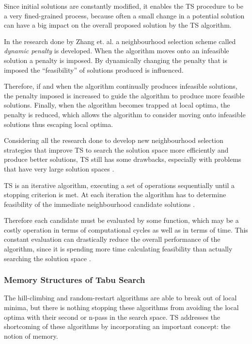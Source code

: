 Since initial solutions are constantly modified, it enables the \gls{TS} procedure to be a very fined-grained process, because often a small change in a potential solution can have a big impact on the overall proposed solution by the \gls{TS} algorithm.

In the research done by Zhang et. al.\cite{TSHazardous} a neighbourhood selection scheme called \emph{dynamic penalty} is developed. When the algorithm moves onto an infeasible solution a penalty is imposed. By dynamically changing the penalty that is imposed the ``feasibility'' of solutions produced is influenced. 

Therefore, if and when the algorithm continually produces infeasible solutions, the penalty imposed is increased to guide the algorithm to produce more feasible solutions. Finally, when the algorithm becomes trapped at local optima, the penalty is reduced, which allows the algorithm to consider moving onto infeasible solutions thus escaping local optima.

Considering all the research done to develop new neighbourhood selection strategies that improve \gls{TS} to search the solution space more efficiently and produce better solutions, \gls{TS} still has some drawbacks, especially with problems that have very large solution spaces \cite{EvoParallelTabu}.

TS is an iterative algorithm, executing a set of operations sequentially until a stopping criterion is met\cite{EvoParallelTabu,TabuVechicleRoutingWithTimeWindows}. At each iteration the algorithm has to determine feasibility of the immediate neighbourhood candidate solutions \cite{EvoParallelTabu,TabuVechicleRoutingWithTimeWindows}. 

Therefore each candidate must be evaluated by some function, which may be a costly operation in terms of computational cycles as well as in terms of time\cite{EvoParallelTabu,TabuVechicleRoutingWithTimeWindows}. This constant evaluation can drastically reduce the overall performance of the algorithm, since it is spending more time calculating feasibility than actually searching the solution space \cite{EvoParallelTabu,TabuVechicleRoutingWithTimeWindows}. 

\subsubsection{Memory Structures of Tabu Search}
The hill-climbing and random-restart algorithms are able to break out of local minima, but there is nothing stopping these algorithms from avoiding the local optima with their second or n-pass in the search space. \gls{TS} addresses the shortcoming of these algorithms by incorporating an important concept: the notion of memory.

